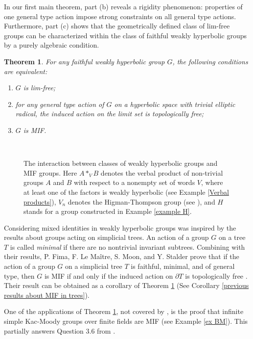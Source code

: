 \documentclass[11pt,letterpaper]{article}
\newtheorem{thmA}{Theorem}[section]
\theoremstyle{definition}
\theoremstyle{remark}
\begin{document}
 
In our first main theorem, part (b) reveals a rigidity phenomenon: properties of one general type action impose strong constraints on all general type actions. Furthermore, part (c) shows that the geometrically defined class of lim-free groups can be characterized within the class of faithful weakly hyperbolic groups by a purely algebraic condition.

\begin{thmA}\label{main_theorem}
For any faithful weakly hyperbolic  group $G$, the following conditions are equivalent:
\begin{enumerate}
\item[(a)] $G$ is lim-free;
\item[(b)] for any general type action of $G$ on a hyperbolic space with trivial elliptic radical, the induced action on the limit set is topologically free;
\item[(c)] $G$ is MIF.
\end{enumerate}
\end{thmA}

\begin{figure}
  \centering\\
   \caption{The interaction between classes of weakly hyperbolic groups and MIF groups. Here $A*_VB$ denotes the verbal product of non-trivial groups $A$ and $B$ with respect to a nonempty set of words $V$, where at least one of the factors is weakly hyperbolic (see Example \ref{Verbal products}), $V_n$ denotes the  Higman-Thompson group (see \cite[Thm. 3.5]{BEH}), and $H$ stands for a group constructed in Example \ref{example H}.}\label{MIF and not MIF}
\end{figure}

Considering mixed identities in weakly hyperbolic groups was inspired by the results about groups acting on simplicial trees. An action of a group $G$ on a tree $T$ is called {\it minimal} if there are no nontrivial invariant subtrees. Combining \cite[Proposition 3.7]{BM} with their results, P. Fima, F. Le Ma\^{i}tre, S. Moon, and Y. Stalder prove that if the action of a group $G$ on a simplicial tree $T$ is faithful, minimal, and of general type, then $G$ is MIF if and only if the induced action on $\partial T$ is topologically free \cite[Theorem B]{FMMS}. Their result can be obtained as a corollary of Theorem \ref{main_theorem} (See Corollary \ref{previous results about MIF in trees}).

One of the applications of Theorem \ref{main_theorem}, not covered by \cite[Theorem B]{FMMS}, is the proof that infinite simple Kac-Moody groups over finite fields are MIF (see Example \ref{ex BM}). This partially answers Question 3.6 from \cite{BFFHZ}. 
\end{document}

